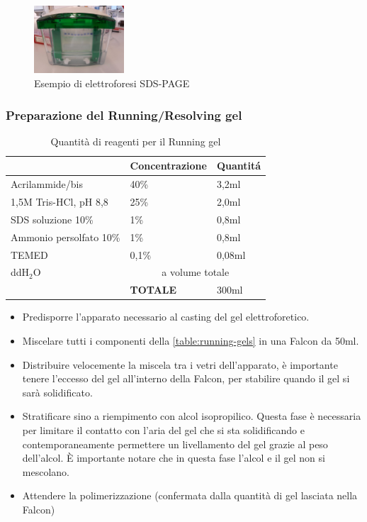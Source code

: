 \begin{figure}[H]
	\centering
	\includegraphics[width=0.3\textwidth]{./immagini/sds-page.jpg}
	\caption{Esempio di elettroforesi SDS-PAGE}
	\label{sds-page}
\end{figure}



\subsubsection{Preparazione del Running/Resolving gel}

\begin{table}
\begin{tabular}{|l|l|l|} \hline
	& \textbf{Concentrazione} & \textbf{Quantit\'a} \\\hline
	Acrilammide/bis & 40\% & 3,2ml \\\hline
	1,5M Tris-HCl, pH 8,8 & 25\% & 2,0ml \\\hline
	SDS soluzione 10\% & 1\% & 0,8ml \\\hline
	Ammonio persolfato 10\% & 1\% & 0,8ml \\\hline
	TEMED & 0,1\% & 0,08ml \\\hline
	ddH$_2$O & \multicolumn{2}{c|}{a volume totale} \\\hline

	& \textbf{TOTALE} & 300ml \\\hline
\end{tabular}
\caption{Quantit\`a di reagenti per il Running gel}
\label{table:running-gel}
\end{table}


\begin{itemize}
	\item Predisporre l'apparato necessario al casting del gel elettroforetico.

	\item Miscelare tutti i componenti della \ref{table:running-gels} in una Falcon da 50ml.

	\item Distribuire velocemente la miscela tra i vetri dell'apparato, \`e importante
	tenere l'eccesso del gel all'interno della Falcon, per stabilire quando il gel
	si sar\`a solidificato.

	\item Stratificare sino a riempimento con alcol isopropilico.
	Questa fase \`e necessaria per limitare il contatto con l'aria
	del gel che si sta solidificando e contemporaneamente	permettere
	un livellamento del gel grazie al peso dell'alcol.
	\`E importante notare che in questa fase l'alcol e
	il gel non si mescolano.

	\item Attendere la polimerizzazione (confermata dalla quantit\`a di
	gel lasciata nella Falcon)
\end{itemize}

